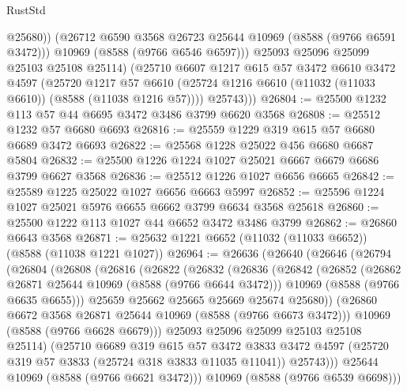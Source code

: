 \begin{lexlean}{RustStd}
\begin{coremodule}
                @25680))
            (@26712 @6590 @3568 @26723 @25644 @10969 (@8588 (@9766 @6591 @3472)))
            @10969
            (@8588 (@9766 @6546 @6597)))
          @25093
          @25096
          @25099
          @25103
          @25108
          @25114)
        (@25710
          @6607
          @1217
          @615
          @57
          @3472
          @6610
          @3472
          @4597
          (@25720
            @1217
            @57
            @6610
            (@25724 @1216 @6610 (@11032 (@11033 @6610)) (@8588 (@11038 @1216 @57))))
          @25743)))
@26804 := @25500 @1232 @113 @57 @44 @6695 @3472 @3486 @3799 @6620 @3568
@26808 := @25512 @1232 @57 @6680 @6693
@26816 := @25559 @1229 @319 @615 @57 @6680 @6689 @3472 @6693
@26822 := @25568 @1228 @25022 @456 @6680 @6687 @5804
@26832 := @25500 @1226 @1224 @1027 @25021 @6667 @6679 @6686 @3799 @6627 @3568
@26836 := @25512 @1226 @1027 @6656 @6665
@26842 := @25589 @1225 @25022 @1027 @6656 @6663 @5997
@26852 := @25596 @1224 @1027 @25021 @5976 @6655 @6662 @3799 @6634 @3568 @25618
@26860 := @25500 @1222 @113 @1027 @44 @6652 @3472 @3486 @3799
@26862 := @26860 @6643 @3568
@26871 := @25632 @1221 @6652 (@11032 (@11033 @6652)) (@8588 (@11038 @1221 @1027))
@26964 := @26636
    (@26640
      (@26646
        (@26794
          (@26804
            (@26808
              (@26816
                (@26822
                  (@26832
                    (@26836
                      (@26842
                        (@26852
                          (@26862 @26871 @25644 @10969 (@8588 (@9766 @6644 @3472)))
                          @10969
                          (@8588 (@9766 @6635 @6655)))
                        @25659
                        @25662
                        @25665
                        @25669
                        @25674
                        @25680))
                    (@26860 @6672 @3568 @26871 @25644 @10969 (@8588 (@9766 @6673 @3472)))
                    @10969
                    (@8588 (@9766 @6628 @6679)))
                  @25093
                  @25096
                  @25099
                  @25103
                  @25108
                  @25114)
                (@25710
                  @6689
                  @319
                  @615
                  @57
                  @3472
                  @3833
                  @3472
                  @4597
                  (@25720 @319 @57 @3833 (@25724 @318 @3833 @11035 @11041))
                  @25743)))
            @25644
            @10969
            (@8588 (@9766 @6621 @3472)))
          @10969
          (@8588 (@9766 @6539 @6698)))

\end{coremodule}
\end{lexlean}
